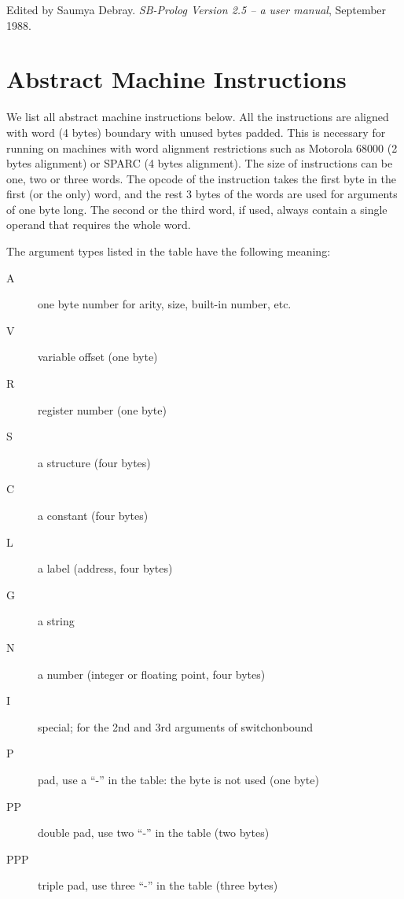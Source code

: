 \documentclass[11pt]{article}
\begin{document}
\begin{thebibliography}{[8]}
	Edited by Saumya Debray. {\it SB-Prolog Version 2.5 -- a user manual},
	September 1988.
\end{thebibliography}

\newpage

\appendix

\section		{Abstract Machine Instructions}

We list all abstract machine instructions below. All the instructions
are aligned with word (4 bytes) boundary with unused bytes padded.
This is necessary for running on machines with word alignment
restrictions such as Motorola 68000 (2 bytes alignment) or SPARC (4
bytes alignment). The size of instructions can be one, two or three
words. The opcode of the instruction takes the first byte in the first
(or the only) word, and the rest 3 bytes of the words are used for
arguments of one byte long. The second or the third word, if used,
always contain a single operand that requires the whole word.  

The
argument types listed in the table have the following meaning:

\begin{description}
  \item[A] one byte number for arity, size, built-in number, etc.
  \item[V] variable offset (one byte)
  \item[R] register number (one byte)
  \item[S] a structure (four bytes)
  \item[C] a constant (four bytes)
  \item[L] a label (address, four bytes)
  \item[G] a string
  \item[N] a number (integer or floating point, four bytes)
  \item[I] special; for the 2nd and 3rd arguments of switchonbound
  \item[P] pad, use a ``-'' in the table: the byte is not used (one byte)
  \item[PP] double pad, use two ``-'' in the table (two bytes)
  \item[PPP] triple pad, use three ``-'' in the table (three bytes)
\end{description}
\end{document}
